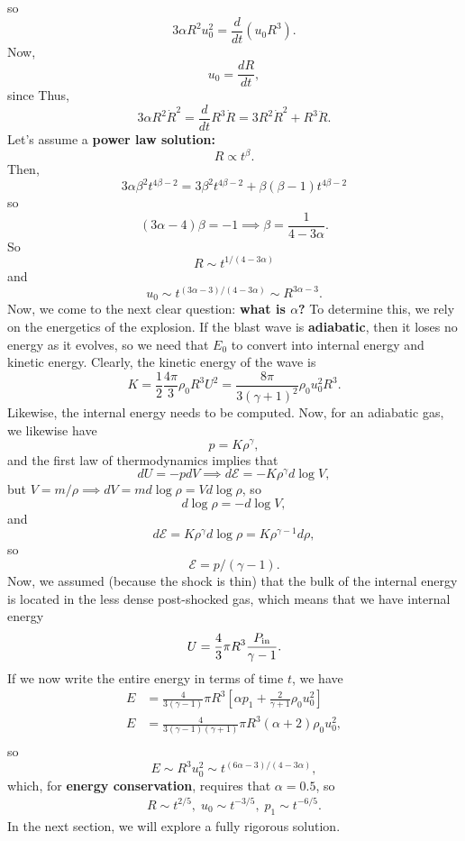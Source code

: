 so
\[
3\alpha R^2 u_0^2 = \frac{d}{dt} \left(u_0 R^3\right) .
\]
Now,
\[
u_0 = \frac{dR}{dt},
\]
since  Thus,
\[
3\alpha R^2 \dot{R}^2 = \frac{d}{dt} R^3 \dot{R} = 3R^2 \dot{R}^2 + R^3 \ddot{R}.
\]
Let's assume a \textbf{power law solution:}
\[
R \propto t^\beta.
\]
Then, 
\[
3\alpha \beta^2 t^{4\beta -2} = 3\beta^2t^{4\beta -2} + \beta(\beta-1)t^{4\beta -2}
\]
so
\[
(3\alpha -4)\beta = - 1 \implies \beta =\frac{1}{4-3\alpha}.
\]
So
\[
\boxed{
R \sim t^{1/(4-3\alpha)}
}
\]
and
\[
\boxed{
u_0 \sim t^{(3\alpha -3)/(4-3\alpha)} \sim R^{3\alpha -3}.
}
\]
Now, we come to the next clear question: \textbf{what is $\alpha$?} To determine this, we rely on the energetics of the explosion. If the blast wave is \textbf{adiabatic}, then it loses no energy as it evolves, so we need that $E_0$ to convert into internal energy and kinetic energy. Clearly, the kinetic energy of the wave is
\[
K = \frac{1}{2} \frac{4\pi}{3} \rho_0 R^3 U^2 = \frac{8\pi}{3(\gamma +1)^2} \rho_0u_0^2R^3.
\]
Likewise, the internal energy needs to be computed. Now, for an adiabatic gas, we likewise have
\[
p =K \rho^\gamma,
\]
and the first law of thermodynamics implies that
\[
dU = - pdV \implies d\mathcal{E} = - K\rho^\gamma d\log V,
\]
but $V = m/\rho \implies dV = m d \log \rho  = V d\log \rho$, so
\[
d\log \rho = - d\log V,
\]
and
\[
d\mathcal{E} = K \rho^{\gamma} d\log \rho = K \rho^{\gamma -1} d\rho,
\]
so
\[
\mathcal{E} = p/(\gamma -1).
\]
Now, we assumed (because the shock is thin) that the bulk of the internal energy is located in the less dense post-shocked gas, which means that we have internal energy
\[
U = \frac{4}{3}\pi R^3\frac{P_{\rm in}}{\gamma -1}.
\]
If we now write the entire energy in terms of time $t$, we have
\[
\begin{aligned}
    E &= \frac{4}{3(\gamma -1)}\pi R^3\left[\alpha p_1 + \frac{2}{\gamma +1} \rho_0u_0^2\right]\\
    E &=  \frac{4}{3(\gamma -1)(\gamma+1)}\pi R^3\left(\alpha+ 2\right) \rho_0u_0^2,\\
\end{aligned}
\]
so 
\[
E \sim R^3u_0^2 \sim t^{(6\alpha -3)/(4-3\alpha)},
\]
which, for \textbf{energy conservation}, requires that $\alpha = 0.5$, so
\begin{equation}
    \boxed{
    \begin{aligned}
        R\sim t^{2/5},\; u_0\sim t^{-3/5},\;p_1\sim t^{-6/5}.
    \end{aligned}
    }
\end{equation}
In the next section, we will explore a fully rigorous solution.

